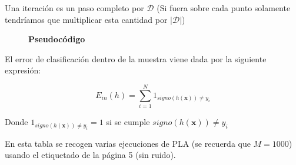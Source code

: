\documentclass{article}
\begin{document}
    Una iteración es un paso completo por $\mathcal{D}$ (Si fuera sobre cada punto solamente tendríamos
    que multiplicar esta cantidad por $|\mathcal{D}|$)

    \begin{figure}[h]
        \textbf{Pseudocódigo}
        \begin{algorithmic}
             
                    \EndIf
                \EndFor
            \EndWhile
            \EndFunction
        \end{algorithmic}
    \end{figure}

    El error de clasificación dentro de la muestra viene dada por la siguiente expresión:

    \begin{equation*}
        E_{in}(h) = \sum^{N}_{i=1}1_{signo(h(\textbf{x})) \neq y_i}
    \end{equation*}

    Donde $1_{signo(h(\textbf{x})) \neq y_i} = 1$ si se cumple $signo(h(\textbf{x})) \neq y_i$
    
    \pagebreak

    En esta tabla se recogen varias ejecuciones de PLA (se recuerda que $M=1000$) usando
    el etiquetado de la página 5 (sin ruido).
\end{document}
